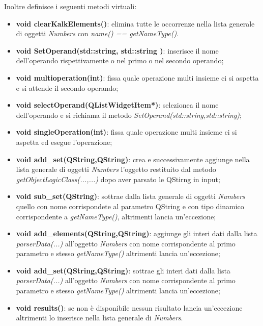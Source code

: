 \documentclass[a4paper,10pt]{article}
\begin{document}
        Inoltre definisce i seguenti metodi virtuali:
        \begin{itemize}
            \item \textbf{void clearKalkElements()}: elimina tutte le occorrenze nella lista generale di oggetti \textit{Numbers} con \textit{name() == getNameType()}.
            \item \textbf{void SetOperand(std::string, std::string )}: inserisce il nome dell'operando rispettivamente o nel primo o nel secondo operando;
            \item \textbf{void multioperation(int)}: fissa quale operazione multi insieme ci si aspetta e si attende il secondo operando;
            \item \textbf{void selectOperand(QListWidgetItem*)}: selezionea il nome dell'operando e si richiama il metodo \textit{SetOperand(std::string,std::string)};
            \item \textbf{void singleOperation(int)}: fissa quale operazione multi insieme ci si aspetta ed esegue l'operazione;
            \item \textbf{void add\_set(QString,QString)}: crea e successivamente aggiunge nella lista generale di oggetti \textit{Numbers} l'oggetto restituito dal metodo \textit{getObjectLogicClass(...,...)} dopo aver parsato le QStirng in input;
            \item \textbf{void sub\_set(QString)}: sottrae dalla lista generale di oggetti \textit{Numbers} quello con nome corrispondete al parametro QString e con tipo dinamico corrispondente a \textit{getNameType()}, altrimenti lancia un'eccezione;
            \item \textbf{void add\_elements(QString,QString)}: aggiunge gli interi dati dalla lista \textit{parserData(...)} all'oggetto \textit{Numbers} con nome corrispondente al primo parametro e stesso \textit{getNameType()} altrimenti lancia un'eccezione;
            \item \textbf{void add\_set(QString,QString)}: sottrae gli interi dati dalla lista \textit{parserData(...)} all'oggetto \textit{Numbers} con nome corrispondente al primo parametro e stesso \textit{getNameType()} altrimenti lancia un'eccezione;
            \item \textbf{void results()}: se non è disponibile nessun risultato lancia un'eccezione altrimenti lo inserisce nella lista generale di \textit{Numbers}.
        \end{itemize}
\end{document}
